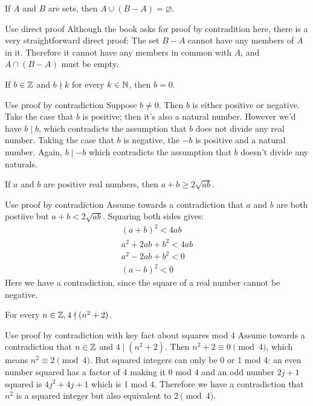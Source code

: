 \documentclass{article}
\begin{document}
\begin{problem}
    If $A$ and $B$ are sets, then $A \cup (B - A) = \varnothing$.
\end{problem}
\begin{solution}{Use direct proof}
    Although the book asks for proof by contradition here, there is a very straightforward direct proof:
    The set $B - A$ cannot have any members of $A$ in it. Therefore it cannot have any members in common with $A$, and $A \cap (B - A)$ must be empty.
\end{solution}

\begin{problem}
    If $b \in \mathbb{Z}$ and $b \nmid k$ for every $k \in \mathbb{N}$, then $b = 0$.
\end{problem}
\begin{solution}{Use proof by contradiction}
    Suppose $b\neq 0$. Then $b$ is either positive or negative. Take the case that $b$ is positive; then it's also a natural number. However we'd have $b \mid b$, which contradicts the assumption that $b$ does not divide any real number. Taking the case that $b$ is negative, the $-b$ is positive and a natural number. Again, $b \mid -b$ which contradicts the assumption that $b$ doesn't divide any naturals.
\end{solution}

\begin{problem}
    If $a$ and $b$ are positive real numbers, then $a + b \geq 2\sqrt{ab}$.
\end{problem}
\begin{solution}{Use proof by contradiction}
   Assume towards a contradiction that $a$ and $b$ are both postiive but $a + b < 2\sqrt{ab}$. Squaring both sides gives:
   \begin{align*}
        (a + b)^2 < 4ab \\
        a^2 + 2ab + b^2 < 4ab \\
        a^2 - 2ab + b^2 < 0 \\
        (a - b)^2 < 0
    \end{align*}
    Here we have a contradiction, since the square of a real number cannot be negative.
\end{solution}

\begin{problem}
    For every $n \in \mathbb{Z}, 4 \nmid (n^2 + 2)$.
\end{problem}
\begin{solution}{Use proof by contradiction with key fact about squares mod 4}
    Assume towards a contradiction that $n \in \mathbb{Z}$ and $4 \mid (n^2 + 2)$. Then $n^2 + 2 \equiv 0 \pmod{4}$, which means $n^2 \equiv 2 \pmod{4}$. But squared integers can only be 0 or 1 mod 4: an even number squared has a factor of 4 making it 0 mod 4 and an odd number $2j + 1$ squared is $4j^2 + 4j + 1$ which is 1 mod 4. Therefore we have a contradiction that $n^2$ is a squared integer but also equivalent to $2 \pmod{4}$.
\end{solution}
\end{document}
